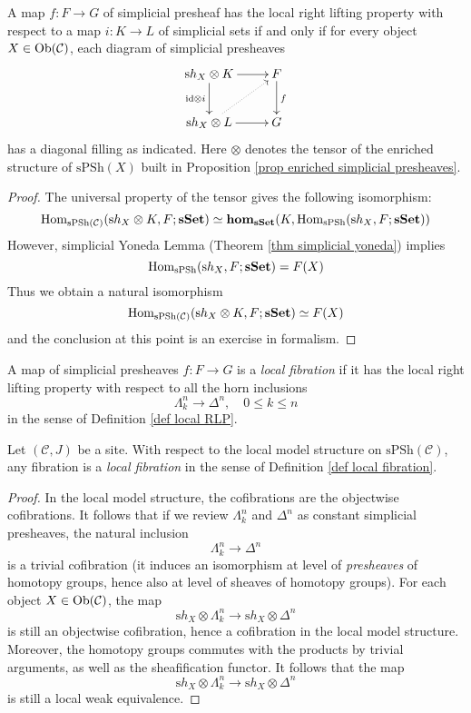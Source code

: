 \begin{refsection}
\begin{lemma}
A map $f \colon F \to G$ of simplicial presheaf has the local right lifting property with respect to a map $i \colon K \to L$ of simplicial sets if and only if for every object $X \in \mathrm{Ob}(\mathcal C)$, each diagram of simplicial presheaves
\[
\xymatrix{
\mathrm sh_X \otimes K \ar[d]_{\mathrm{id} \otimes i} \ar[r] & F \ar[d]^f \\ \mathrm sh_X \otimes L \ar[r] \ar@{.>}[ur] & G 
}
\]
has a diagonal filling as indicated. Here $\otimes$ denotes the tensor of the enriched structure of $\mathrm{sPSh}(X)$ built in Proposition \ref{prop enriched simplicial presheaves}.
\end{lemma}

\begin{proof}
The universal property of the tensor gives the following isomorphism:
\[
\mathrm{Hom}_{\mathrm{sPSh}(\mathcal C)}(\mathrm sh_X \otimes K, F;\mathbf{sSet}) \simeq \mathbf{hom}_{\mathbf{sSet}}(K, \mathrm{Hom}_{\mathrm{sPSh}}(\mathrm sh_X,F;\mathbf{sSet}))
\]
However, simplicial Yoneda Lemma (Theorem \ref{thm simplicial yoneda}) implies
\[
\mathrm{Hom}_{\mathrm{sPSh}}(\mathrm sh_X,F;\mathbf{sSet}) = F(X)
\]
Thus we obtain a natural isomorphism
\[
\mathrm{Hom}_{\mathrm{sPSh}(\mathcal C)}(\mathrm sh_X \otimes K, F;\mathbf{sSet}) \simeq F(X)
\]
and the conclusion at this point is an exercise in formalism.
\end{proof}

\begin{defin} \label{def local fibration}
A map of simplicial presheaves $f \colon F \to G$ is a \emph{local fibration} if it has the local right lifting property with respect to all the horn inclusions
\[
\Lambda^n_k \to \Delta^n, \quad 0 \le k \le n
\]
in the sense of Definition \ref{def local RLP}.
\end{defin}

\begin{lemma}
Let $(\mathcal C,J)$ be a site. With respect to the local model structure on $\mathrm{sPSh}(\mathcal C)$, any fibration is a \emph{local fibration} in the sense of Definition \ref{def local fibration}.
\end{lemma}

\begin{proof}
In the local model structure, the cofibrations are the objectwise cofibrations. It follows that if we review $\Lambda^n_k$ and $\Delta^n$ as constant simplicial presheaves, the natural inclusion
\[
\Lambda^n_k \to \Delta^n
\]
is a trivial cofibration (it induces an isomorphism at level of \emph{presheaves} of homotopy groups, hence also at level of sheaves of homotopy groups). For each object $X \in \mathrm{Ob}(\mathcal C)$, the map
\[
\mathrm sh_X \otimes \Lambda^n_k \to \mathrm sh_X \otimes \Delta^n
\]
is still an objectwise cofibration, hence a cofibration in the local model structure. Moreover, the homotopy groups commutes with the products by trivial arguments, as well as the sheafification functor. It follows that the map
\[
\mathrm sh_X \otimes \Lambda^n_k \to \mathrm sh_X \otimes \Delta^n
\]
is still a local weak equivalence.


\end{proof}
\end{refsection}
